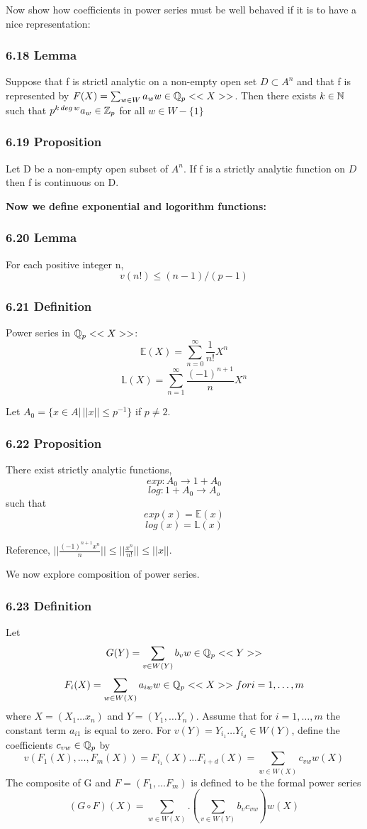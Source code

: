 Now show how coefficients in power series must be well behaved if it is to have a nice representation:

\subsubsection{6.18 Lemma}
Suppose that f is strictl analytic on a non-empty open set $D\subset A^n$ and that f is represented by $F(X) = \sum_{w\in W}a_w w \in \mathbb Q_p<<X>>$. Then there exists $k\in \mathbb N$ such that $p^{k\, deg\, w}a_w\in \mathbb Z_p$ for all $w\in W - \{ 1 \}$

\subsubsection*{6.19 Proposition}
Let D be a non-empty open subset of $A^n$. If f is a strictly analytic function on $D$ then f is continuous on D.

\textbf{Now we define exponential and logorithm functions:}

\subsubsection*{6.20 Lemma}
For each positive integer n,
$$v(n!)\leq (n-1) / (p-1)$$

\subsubsection*{6.21 Definition}
Power series in $\mathbb Q_p<<X>>$:
$$\mathbb E (X) = \sum_{n=0}^\infty \frac {1}{n!} X^n$$
$$\mathbb L(X) = \sum_{n=1}^\infty \frac{(-1)^{n+1}}{n} X^n$$

Let $A_0 = \{x\in A |\, ||x||\leq p^{-1}\}$ if $p\neq 2$.

\subsubsection*{6.22 Proposition}
There exist strictly analytic functions,
$$exp:A_0\rightarrow 1+A_0$$
$$log:1+A_0\rightarrow A_o$$
such that
$$exp(x) = \mathbb E(x)$$
$$log(x) = \mathbb L(x)$$

Reference, $||\frac{(-1)^{n+1}x^n}{n}||\leq||\frac{x^n}{n!}||\leq||x||$.

We now explore composition of power series.

\subsubsection*{6.23 Definition}
Let
$$ G(Y) = \sum_{v\in W(Y)}b_vw\in\mathbb Q_p<<Y>>$$
$$F_i(X) = \sum_{w\in W(X)} a_{iw}w\in\mathbb Q_p <<X>> for i=1,\dots , m$$
where $X=(X_1\dots x_n)$ and $Y=(Y_1,\dots Y_n)$.
Assume that for $i=1,\dots , m$ the constant term $a_{i1}$ is equal to zero. For $v(Y)=Y_{i_1}\dots Y_{i_d}\in W(Y)$, define the coefficients $c_{vw}\in\mathbb Q_p$ by
$$v(F_1(X),\dots , F_m(X)) = F_{i_1}(X)\dots F_{i+d}(X)=\sum_{w\in W(X)}c_{vw} w(X)$$
The composite of G and $F=(F_1,\dots F_m)$ is defined to be the formal power series
$$(G\circ F)(X) = \sum_{w\in W(X)} . (\sum_{v\in W(Y)} b_v c_{vw})w(X)$$

